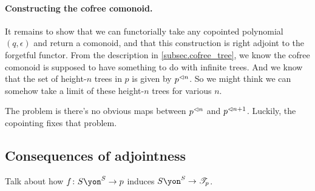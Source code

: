\documentclass[DynamicalBook]{subfiles}
\begin{document}
\paragraph{Constructing the cofree comonoid.}

It remains to show that we can functorially take any copointed polynomial $(q,\epsilon)$ and return a comonoid, and that this construction is right adjoint to the forgetful functor. From the description in \cref{subsec.cofree_tree}, we know the cofree comonoid is supposed to have something to do with infinite trees. And we know that the set of height-$n$ trees in $p$ is given by $p^{\lhd n}$. So we might think we can somehow take a limit of these height-$n$ trees for various $n$. 

The problem is there's no obvious maps between $p^{\lhd n}$ and $p^{\lhd n+1}$. Luckily, the copointing fixes that problem.


\subsection{Consequences of adjointness}



Talk about how $f\colon S\yon^S\to p$ induces $S\yon^S\to\cofree{p}$.
\end{document}
